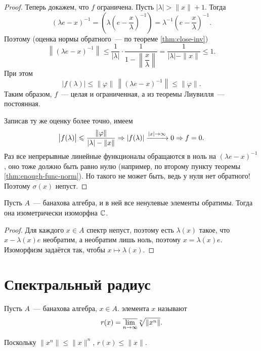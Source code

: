 \documentclass{notes}
\begin{document}
\begin{thm}
\begin{proof}
			Теперь докажем, что $f$ ограничена. Пусть $|\lambda| > \|x\| + 1$. Тогда
			\[
				(\lambda e - x)^{-1} = \left(\lambda\left(e - \dfrac{x}{\lambda}\right)^{-1}\right) = \lambda^{-1} \left(e - \dfrac{x}{\lambda}\right)^{-1}.
			\]
			Поэтому (оценка нормы обратного~--- по теореме \ref{thm:close-inv})
			\[
				\left\|(\lambda e - x)^{-1}\right\| \leqslant \dfrac{1}{|\lambda|} \cdot \dfrac{1}{1 - \left\|\dfrac{x}{\lambda}\right\|} = \dfrac{1}{|\lambda| - \|x\|} \leqslant 1.
			\]
			При этом
			\[
				\big|f(\lambda)\big| \leqslant \|\varphi\| \, \left\|(\lambda e - x)^{-1}\right\| \leqslant \|\varphi\|.
			\]
			Таким образом, $f$~--- целая и ограниченная, а из теоремы Лиувилля~--- постоянная.

			Записав ту же оценку более точно, имеем
			\[
				\big|f(\lambda)\big| \leqslant \dfrac{\|\varphi\|}{|\lambda| - \|x\|} \Rightarrow |f(\lambda)| \xrightarrow{|x| \to \infty} 0 \Rightarrow f = 0.
			\]
			Раз все непрерывные линейные функционалы обращаются в ноль на $(\lambda e - x)^{-1}$, оно тоже должно быть равно нулю (например, по второму пункту теоремы \ref{thm:enough-func-norm}). Но такого не может быть, ведь у нуля нет обратного! Поэтому $\sigma(x)$ непуст.
		\end{proof}
	\end{thm}

	\begin{thm}
		Пусть $A$~--- банахова алгебра, и в ней все ненулевые элементы обратимы. Тогда она изометрически изоморфна $\mathbb{C}$.
		\begin{proof}
			Для каждого $x \in A$ спектр непуст, поэтому есть $\lambda(x)$ такое, что $x - \lambda(x) e$ необратим, а необратим лишь ноль, поэтому $x = \lambda(x) e$. Изоморфизм задаётся так, чтобы $x \mapsto \lambda(x)$.
		\end{proof}
	\end{thm}

\section{Спектральный радиус}

	\begin{de}
		Пусть $A$~--- банахова алгебра, $x \in A$.  элемента $x$ называют
		\[
			r(x) = \overline{\lim\limits_{n \to \infty}} \sqrt[n]{\|x^n\|}.
		\]
	\end{de}

	\begin{rem}
		Поскольку $\|x^n\| \leqslant \|x\|^n$, $r(x) \leqslant \|x\|$.
	\end{rem}
\end{document}
